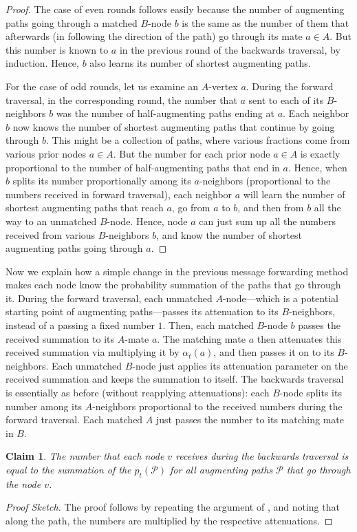 \documentclass[11pt]{article}
\newcommand{\ktodo}[1]{\todo[color=yellow]{\textbf{Keren}: #1}}
\newtheorem{claim}[theorem]{Claim}
\begin{document}
\begin{proof}
The case of even rounds follows easily because the number of augmenting paths going through a matched $B$-node $b$ is the same as the number of them that afterwards (in following the direction of the path) go through its mate $a\in A$. But this number is known to $a$ in the previous round of the backwards traversal, by induction. Hence, $b$ also learns its number of shortest augmenting paths.

For the case of odd rounds, let us examine an $A$-vertex $a$. During the forward traversal, in the corresponding round, the number that $a$ sent to each of its $B$-neighbors $b$ was the number of half-augmenting paths ending at $a$. Each neighbor $b$ now knows the number of shortest augmenting paths that continue by going through $b$. This might be a collection of paths, where various fractions come from various prior nodes $a\in A$. But the number for each prior node $a\in A$ is exactly proportional to the number of half-augmenting paths that end in $a$. Hence, when $b$ splits its number proportionally among its $a$-neighbors (proportional to the numbers received in forward traversal), each neighbor $a$ will learn the number of shortest augmenting paths that reach $a$, go from $a$ to $b$, and then from $b$ all the way to an unmatched $B$-node. Hence, node $a$ can just sum up all the numbers received from various $B$-neighbors $b$, and know the number of shortest augmenting paths going through $a$.
\end{proof}

Now we explain how a simple change in the previous message forwarding method makes each node know the probability summation of the paths that go through it. During the forward traversal, each unmatched $A$-node---which is a potential starting point of augmenting paths---passes its attenuation to its $B$-neighbors, instead of a passing a fixed number $1$. Then, each matched $B$-node $b$ passes the received summation to its $A$-mate $a$. The matching mate $a$ then attenuates this received summation via multiplying it by $\alpha_{t}(a)$, and then passes it on to its $B$-neighbors. Each unmatched $B$-node just applies its attenuation parameter on the received summation and keeps the summation to itself. The backwards traversal is essentially as before (without reapplying attenuations): each $B$-node splits its number among its $A$-neighbors proportional to the received numbers during the forward traversal. Each matched $A$ just passes the number to its matching mate in $B$.

\begin{claim}
The number that each node $v$ receives during the backwards traversal is equal to the summation of the $p_{t}(\mathcal{P})$ for all augmenting paths $\mathcal{P}$ that go through the node $v$.
\end{claim}
\begin{proof}[Proof Sketch] The proof follows by repeating the argument of , and noting that along the path, the numbers are multiplied by the respective attenuations.
\end{proof}
\end{document}
